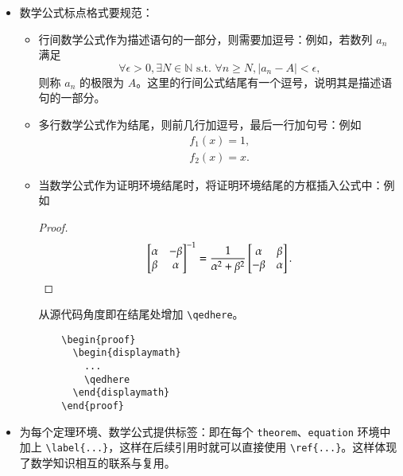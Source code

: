 \begin{itemize}
  \item 数学公式标点格式要规范：
    \begin{itemize}
      \item 行间数学公式作为描述语句的一部分，则需要加逗号：例如，若数列 $a_n$ 满足
      \begin{equation}
        \label{eq:punctation1}
        \forall \epsilon > 0, \exists N \in \mathbb{N} \text{ s.t. } \forall n \geq N, |a_n - A| < \epsilon,
      \end{equation}
        则称 $a_n$ 的极限为 $A$。这里的行间公式结尾有一个逗号，说明其是描述语句的一部分。
      \item 多行数学公式作为结尾，则前几行加逗号，最后一行加句号：例如
      \begin{align}
        \label{eq:punctation2}
        f_1(x) = 1, \\
        f_2(x) = x.
      \end{align}
    \item 当数学公式作为证明环境结尾时，将证明环境结尾的方框插入公式中：例如
    \begin{proof}
      \begin{displaymath}
        \begin{bmatrix}
          \alpha & -\beta
          \\
          \beta & \alpha
        \end{bmatrix}^{-1}
        =
        \frac{1}{\alpha^2+\beta^2}
        \begin{bmatrix}
          \alpha & \beta
          \\
          -\beta & \alpha
        \end{bmatrix}.
        \qedhere
      \end{displaymath}
    \end{proof}
    从源代码角度即在结尾处增加 \lstinline|\qedhere|。

    \begin{lstlisting}
    \begin{proof}
      \begin{displaymath}
        ...
        \qedhere
      \end{displaymath}
    \end{proof}
    \end{lstlisting}

  \end{itemize}
  \item 为每个定理环境、数学公式提供标签：即在每个 \lstinline|theorem|、\lstinline|equation| 环境中加上 \lstinline|\label{...}|，这样在后续引用时就可以直接使用 \lstinline|\ref{...}|。这样体现了数学知识相互的联系与复用。
\end{itemize}


